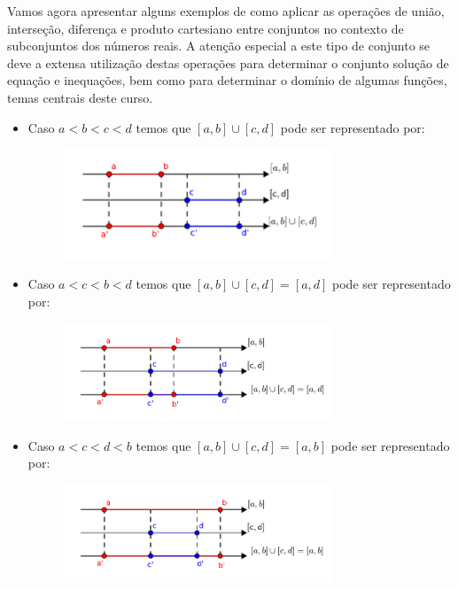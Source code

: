 Vamos agora apresentar alguns exemplos de como aplicar as operações de união, interseção, diferença e produto cartesiano entre conjuntos no contexto de subconjuntos dos números reais. A atenção especial a este tipo de conjunto se deve a extensa utilização destas operações para determinar o conjunto solução de equação e inequações, bem como para determinar o domínio de algumas funções, temas centrais deste curso.

\begin{itemize}
 \item Caso $a< b< c< d$ temos que $[a, b] \cup [c, d]$ pode ser representado por:
  \begin{figure}[H]
 \centering
 \includegraphics[width=8cm]{Capitulos/Figuras/uniaoabcd.pdf}
 \end{figure}

 \item Caso $a< c< b< d$ temos que $[a, b] \cup [c, d]= [a, d]$ pode ser representado por:
  \begin{figure}[H]
 \centering
 \includegraphics[width=8cm]{Capitulos/Figuras/uniaoacbd.pdf}
 \end{figure}

  \item Caso $a< c< d< b$ temos que $[a, b] \cup [c, d]= [a, b]$ pode ser representado por:
  \begin{figure}[H]
 \centering
 \includegraphics[width=8cm]{Capitulos/Figuras/uniaoacdb.pdf}
 \end{figure}


\end{itemize}
